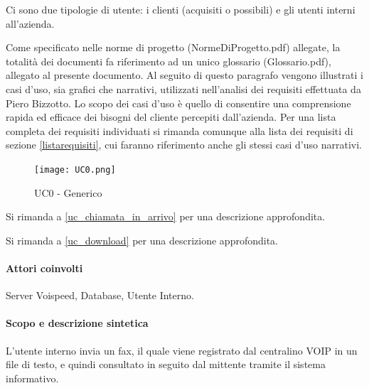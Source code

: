 \label{definizione_utente}
Ci sono due tipologie di utente: i clienti (acquisiti o possibili) e gli utenti interni all'azienda.



Come specificato nelle norme di progetto (NormeDiProgetto.pdf) allegate, la totalit\` a dei documenti fa riferimento ad un unico glossario (Glossario.pdf), allegato al presente documento.
\newpage
{}
Al seguito di questo paragrafo vengono illustrati i casi d'uso, sia grafici che narrativi, utilizzati nell'analisi dei requisiti effettuata da Piero Bizzotto. Lo scopo dei casi d'uso \`e quello di consentire una comprensione rapida ed efficace dei bisogni del cliente percepiti dall'azienda. Per una lista completa dei requisiti individuati si rimanda comunque alla lista dei requisiti di sezione \ref{listarequisiti}, cui faranno riferimento anche gli stessi casi d'uso narrativi.

\begin{figure}[!ht]
\centering
\texttt{[image: UC0.png]}
\caption{UC0 - Generico}
\end{figure}


Si rimanda a \ref{uc_chiamata_in_arrivo} per una descrizione approfondita.

Si rimanda a \ref{uc_download} per una descrizione approfondita.

\paragraph{Attori coinvolti} Server Voispeed, Database, Utente Interno.
\paragraph{Scopo e descrizione sintetica}
L'utente interno invia un fax, il quale viene registrato dal centralino VOIP in un file di testo, e quindi consultato in seguito dal mittente tramite il sistema informativo.
